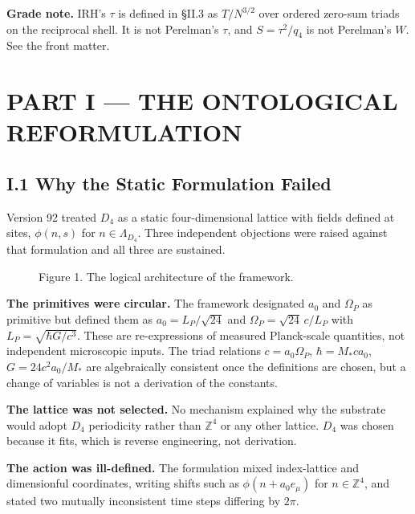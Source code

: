 \documentclass[11pt,a4paper]{article}
\newcommand{\gradebox}[1]{\par\smallskip\noindent\textbf{Grade note.} #1\par\smallskip}
\begin{document}
\gradebox{IRH's $\tau$ is defined in \S II.3 as $T/N^{3/2}$ over ordered zero-sum triads on the reciprocal shell. It is not Perelman's $\tau$, and $S = \tau^2/q_4$ is not Perelman's $W$. See the front matter.}

\section{PART I --- THE ONTOLOGICAL REFORMULATION}

\subsection{I.1 Why the Static Formulation Failed}
Version 92 treated $D_4$ as a static four-dimensional lattice with fields defined at sites, $\phi(n, s)$ for $n \in \Lambda_{D_4}$. Three independent objections were raised against that formulation and all three are sustained.

\begin{figure}[h]
\centering
{}
\caption{Figure 1. The logical architecture of the framework.}
\end{figure}

\textbf{The primitives were circular.} The framework designated $a_0$ and $\Omega_P$ as primitive but defined them as $a_0 = L_P/\sqrt{24}$ and $\Omega_P = \sqrt{24}\,c/L_P$ with $L_P = \sqrt{\hbar G/c^3}$. These are re-expressions of measured Planck-scale quantities, not independent microscopic inputs. The triad relations $c = a_0\Omega_P$, $\hbar = M_* c a_0$, $G = 24c^2a_0/M_*$ are algebraically consistent once the definitions are chosen, but a change of variables is not a derivation of the constants.

\textbf{The lattice was not selected.} No mechanism explained why the substrate would adopt $D_4$ periodicity rather than $\mathbb{Z}^4$ or any other lattice. $D_4$ was chosen because it fits, which is reverse engineering, not derivation.

\textbf{The action was ill-defined.} The formulation mixed index-lattice and dimensionful coordinates, writing shifts such as $\phi(n + a_0 e_\mu)$ for $n \in \mathbb{Z}^4$, and stated two mutually inconsistent time steps differing by $2\pi$.
\end{document}
